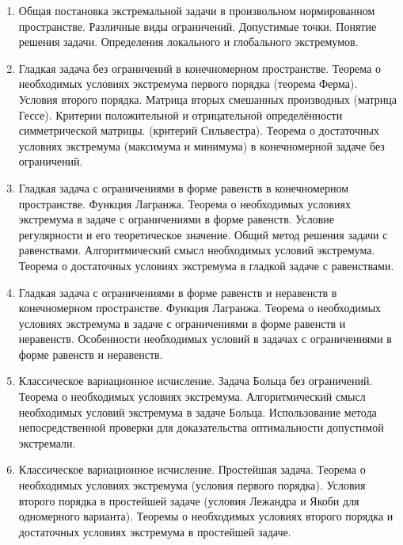 % 
%

\begin{enumerate}
\item Общая  постановка  экстремальной  задачи  в  произвольном  нормированном  пространстве.  Различные  виды  ограничений.  Допустимые  точки.  Понятие  решения  задачи.  Определения  локального  и  глобального  экстремумов.

\item Гладкая  задача  без  ограничений  в  конечномерном   пространстве.  Теорема  о  необходимых  условиях  экстремума  первого  порядка (теорема  Ферма).  Условия  второго  порядка.  Матрица  вторых  смешанных  производных  (матрица  Гессе).  Критерии  положительной  и  отрицательной  определённости  симметрической  матрицы. (критерий  Сильвестра).  Теорема  о  достаточных  условиях  экстремума (максимума  и  минимума)  в  конечномерной  задаче  без  ограничений.

\item Гладкая  задача  с  ограничениями  в  форме  равенств  в  конечномерном  пространстве.  Функция  Лагранжа.  Теорема  о  необходимых  условиях  экстремума  в  задаче  с ограничениями  в  форме  равенств.  Условие  регулярности  и  его  теоретическое  значение.  Общий  метод  решения  задачи  с равенствами.  Алгоритмический  смысл  необходимых  условий  экстремума.  Теорема  о  достаточных  условиях  экстремума  в гладкой  задаче  с  равенствами.

\item Гладкая  задача  с  ограничениями  в  форме  равенств  и  неравенств  в  конечномерном  пространстве.  Функция  Лагранжа.  Теорема  о  необходимых  условиях  экстремума  в  задаче  с  ограничениями  в  форме  равенств  и  неравенств.  Особенности  необходимых  условий  в  задачах  с ограничениями  в  форме  равенств   и  неравенств.  

\item Классическое  вариационное  исчисление. Задача  Больца  без  ограничений.  Теорема  о необходимых  условиях  экстремума.  Алгоритмический  смысл  необходимых  условий  экстремума  в  задаче  Больца.  Использование  метода  непосредственной  проверки  для  доказательства  оптимальности  допустимой  экстремали.

\item Классическое  вариационное  исчисление.  Простейшая  задача.  Теорема  о необходимых  условиях  экстремума  (условия  первого  порядка).  Условия  второго порядка  в  простейшей  задаче  (условия  Лежандра  и  Якоби  для  одномерного  варианта).  Теоремы  о  необходимых  условиях  второго  порядка  и  достаточных  условиях  экстремума  в  простейшей  задаче.


\end{enumerate}



